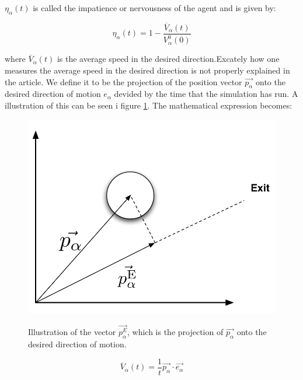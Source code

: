 $\eta_{\alpha} \left( t \right)$ is called the impatience or nervousness of 
the agent and is given by:

\begin{equation}\label{eta}
	\eta_{\alpha} \left( t \right) =
    1 - \frac{\overline{V}_{\alpha} \left( t \right)}
             {V_{\alpha}^{0} \left( 0 \right)}
\end{equation}

where $\overline{V}_{\alpha}\left( t \right)$ is the average speed in the 
desired direction.Excately how one measures the average speed in the desired 
direction is not properly explained in the article. We define it to be the 
projection of the position vector $ \vec{p_{\alpha}} $ onto the desired direction 
of motion $e_{\alpha}$ devided by the time that the simulation has run. A 
illustration of this can be seen i figure \ref{impatience}. The mathematical 
expression becomes:


\begin{figure}[ht]
    \centering
    {\includegraphics[scale=0.35]{Figures/NotationOfAgent2.pdf}} 
    \caption{Illustration of the vector $ \vec{p_{\alpha}^{E}}$, which is the 
    projection of $ \vec{p_{\alpha}} $ onto the desired direction of motion.}
    \label{impatience}
\end{figure}

\begin{equation}\label{averagespeed}
   \overline{V}_{\alpha} \left( t \right) =
   \frac{1}{t} \vec{p_{\alpha}}\cdot \vec{e_{\alpha}} 
\end{equation}

